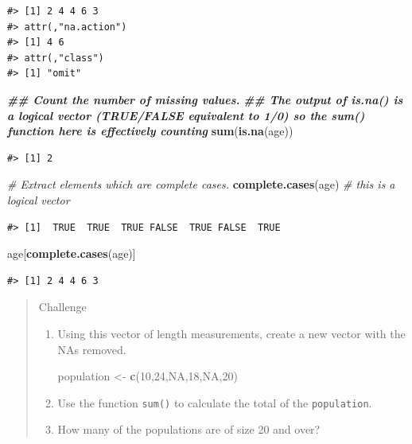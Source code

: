 \documentclass[
]{book}
\newenvironment{Shaded}{\begin{snugshade}}{\end{snugshade}}
\newcommand{\CommentTok}[1]{\textcolor[rgb]{0.56,0.35,0.01}{\textit{#1}}}
\newcommand{\ConstantTok}[1]{\textcolor[rgb]{0.56,0.35,0.01}{#1}}
\newcommand{\DecValTok}[1]{\textcolor[rgb]{0.00,0.00,0.81}{#1}}
\newcommand{\DocumentationTok}[1]{\textcolor[rgb]{0.56,0.35,0.01}{\textbf{\textit{#1}}}}
\newcommand{\FunctionTok}[1]{\textcolor[rgb]{0.13,0.29,0.53}{\textbf{#1}}}
\newcommand{\NormalTok}[1]{#1}
\newcommand{\OtherTok}[1]{\textcolor[rgb]{0.56,0.35,0.01}{#1}}
\begin{document}
\begin{verbatim}
#> [1] 2 4 4 6 3
#> attr(,"na.action")
#> [1] 4 6
#> attr(,"class")
#> [1] "omit"
\end{verbatim}

\begin{Shaded}
\begin{Highlighting}[]
\DocumentationTok{\#\# Count the number of missing values.}
\DocumentationTok{\#\# The output of is.na() is a logical vector (TRUE/FALSE equivalent to 1/0) so the sum() function here is effectively counting}
\FunctionTok{sum}\NormalTok{(}\FunctionTok{is.na}\NormalTok{(age))}
\end{Highlighting}
\end{Shaded}

\begin{verbatim}
#> [1] 2
\end{verbatim}

\begin{Shaded}
\begin{Highlighting}[]
\CommentTok{\# Extract elements which are complete cases.}
\FunctionTok{complete.cases}\NormalTok{(age) }\CommentTok{\# this is a logical vector}
\end{Highlighting}
\end{Shaded}

\begin{verbatim}
#> [1]  TRUE  TRUE  TRUE FALSE  TRUE FALSE  TRUE
\end{verbatim}

\begin{Shaded}
\begin{Highlighting}[]
\NormalTok{age[}\FunctionTok{complete.cases}\NormalTok{(age)]}
\end{Highlighting}
\end{Shaded}

\begin{verbatim}
#> [1] 2 4 4 6 3
\end{verbatim}

\begin{quote}
Challenge

\begin{enumerate}
\def\labelenumi{\arabic{enumi}.}
\item
  Using this vector of length measurements, create a new vector with the NAs
  removed.

\begin{Shaded}
\begin{Highlighting}[]
\NormalTok{population }\OtherTok{\textless{}{-}} \FunctionTok{c}\NormalTok{(}\DecValTok{10}\NormalTok{,}\DecValTok{24}\NormalTok{,}\ConstantTok{NA}\NormalTok{,}\DecValTok{18}\NormalTok{,}\ConstantTok{NA}\NormalTok{,}\DecValTok{20}\NormalTok{)}
\end{Highlighting}
\end{Shaded}
\item
  Use the function \texttt{sum()} to calculate the total of the \texttt{population}.
\item
  How many of the populations are of size 20 and over?
\end{enumerate}
\end{quote}
\end{document}
